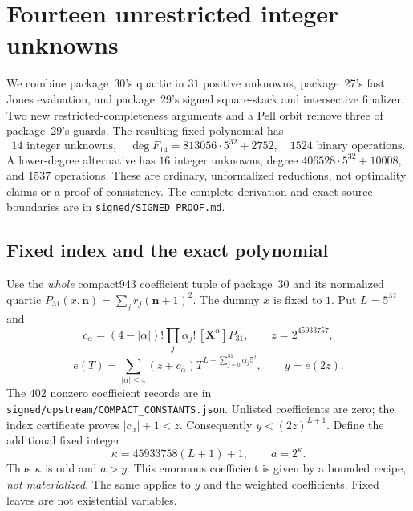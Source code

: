 \section{Fourteen unrestricted integer unknowns}
\label{sec:signed14}

We combine package~30's quartic in $31$ positive unknowns, package~27's
fast Jones evaluation, and package~29's signed square-stack and intersective
finalizer. Two new restricted-completeness arguments and a Pell orbit remove
three of package~29's guards. The resulting fixed polynomial has
\[
 \boxed{14\text{ integer unknowns},\quad
 \deg F_{14}=813056\cdot5^{32}+2752,\quad1524\text{ binary operations}.}
\]
A lower-degree alternative has $16$ integer unknowns, degree
$406528\cdot5^{32}+10008$, and $1537$ operations. These are ordinary,
unformalized reductions, not optimality claims or a proof of consistency.
The complete derivation and exact source boundaries are in
\texttt{signed/SIGNED\_PROOF.md}.

\subsection{Fixed index and the exact polynomial}
Use the \emph{whole} compact943 coefficient tuple of package~30 and its
normalized quartic $P_{31}(x,\mathbf n)=\sum_jr_j(\mathbf n+1)^2$.
The dummy $x$ is fixed to $1$. Put $L=5^{32}$ and
\[
 c_\alpha=(4-|\alpha|)!\prod_j\alpha_j!\,[\mathbf X^\alpha]P_{31},
 \qquad z=2^{45933757},
\]
\[
 e(T)=\sum_{|\alpha|\le4}(z+c_\alpha)
 T^{L-\sum_{j=0}^{31}\alpha_j5^j},\qquad y=e(2z).
\]
The $402$ nonzero coefficient records are in
\texttt{signed/upstream/}\allowbreak\texttt{COMPACT\_CONSTANTS.json}. Unlisted coefficients are zero; the index
certificate proves $|c_\alpha|+1<z$.
Consequently $y<(2z)^{L+1}$. Define the additional fixed integer
\[
 \kappa=45933758(L+1)+1,\qquad a=2^\kappa.
\]
Thus $\kappa$ is odd and $a>y$. This enormous coefficient is given by a
bounded recipe, \emph{not materialized}. The same applies to $y$ and the
weighted coefficients. Fixed leaves are not existential variables.

